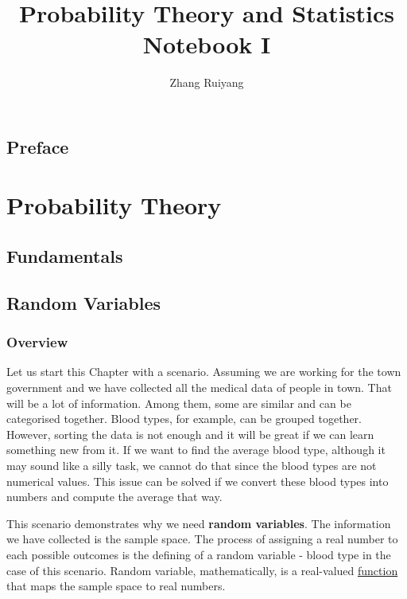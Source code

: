 \documentclass[11pt, a4paper, oneside]{book}
\theoremstyle{definition}
\begin{document}
\frontmatter 

\title{\huge Probability Theory and Statistics Notebook I}
\author{\Large{Zhang Ruiyang}}
\date{}
\maketitle

\tableofcontents

\newpage

\chapter*{Preface}

\mainmatter

\part{Probability Theory} 

\chapter{Fundamentals}

\newpage

\chapter{Random Variables}

\section{Overview}

\noindent Let us start this Chapter with a scenario. Assuming we are working for the town government and we have collected all the medical data of people in town. That will be a lot of information. Among them, some are similar and can be categorised together. Blood types, for example, can be grouped together. However, sorting the data is not enough and it will be great if we can learn something new from it. If we want to find the average blood type, although it may sound like a silly task, we cannot do that since the blood types are not numerical values. This issue can be solved if we convert these blood types into numbers and compute the average that way. 

\noindent This scenario demonstrates why we need \textbf{random variables}. The information we have collected is the sample space. The process of assigning a real number to each possible outcomes is the defining of a random variable - blood type in the case of this scenario. Random variable, mathematically, is a real-valued \underline{function} that maps the sample space to real numbers. 
\end{document}
